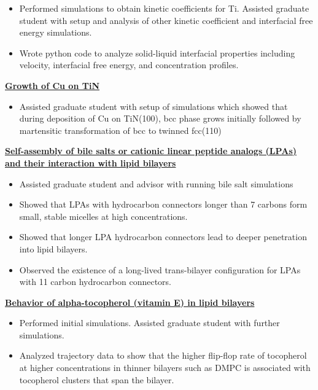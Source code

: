 \begin{cventries}
{\begin{cvitems}
                \begin{itemize}
                \item {Performed simulations to obtain kinetic coefficients for Ti. Assisted graduate student with setup and analysis of other kinetic coefficient and interfacial free energy simulations.}
                \item {Wrote python code to analyze solid-liquid interfacial properties including velocity, interfacial free energy, and concentration profiles.}
                \end{itemize}
            \item {\textbf{\underline{Growth of Cu on TiN}}}
                \begin{itemize}
                \item {Assisted graduate student with setup of simulations which showed that during deposition of Cu on TiN(100), bcc phase grows initially followed by martensitic transformation of bcc to twinned fcc(110)}
                \end{itemize}
            \item {\textbf{\underline{Self-assembly of bile salts or cationic linear peptide analogs (LPAs) and their interaction with lipid bilayers}}}
                \begin{itemize}
                \item {Assisted graduate student and advisor with running bile salt simulations}
                \item {Showed that LPAs with hydrocarbon connectors longer than 7 carbons form small, stable micelles at high concentrations.}
                \item {Showed that longer LPA hydrocarbon connectors lead to deeper penetration into lipid bilayers.}
                \item {Observed the existence of a long-lived trans-bilayer configuration for LPAs with 11 carbon hydrocarbon connectors.}
                \end{itemize}
            \item {\textbf{\underline{Behavior of alpha-tocopherol (vitamin E) in lipid bilayers}}}
                \begin{itemize}
                \item {Performed initial simulations. Assisted graduate student with further simulations.}
                \item {Analyzed trajectory data to show that the higher flip-flop rate of tocopherol at higher concentrations in thinner bilayers such as DMPC is associated with tocopherol clusters that span the bilayer.}

\end{itemize}
\end{cvitems}}
\end{cventries}
